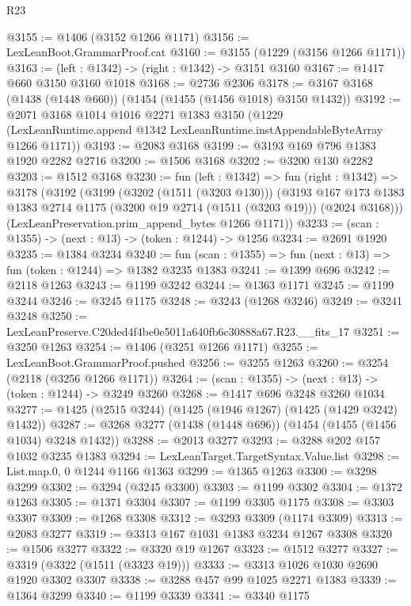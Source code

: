 \begin{lexlean}{R23}
\begin{coremodule}
@3155 := @1406 (@3152 @1266 @1171)
@3156 := LexLeanBoot.GrammarProof.cat
@3160 := @3155 (@1229 (@3156 @1266 @1171))
@3163 := (left : @1342) -> (right : @1342) -> @3151 @3160
@3167 := @1417 @660 @3150 @3160 @1018
@3168 := @2736 @2306
@3178 := @3167 @3168 (@1438 (@1448 @660)) (@1454 (@1455 (@1456 @1018) @3150 @1432))
@3192 := @2071
    @3168
    @1014
    @1016
    @2271
    @1383
    @3150
    (@1229 (LexLeanRuntime.append @1342 LexLeanRuntime.instAppendableByteArray @1266 @1171))
@3193 := @2083 @3168
@3199 := @3193 @169 @796 @1383 @1920 @2282 @2716
@3200 := @1506 @3168
@3202 := @3200 @130 @2282
@3203 := @1512 @3168
@3230 := fun (left : @1342) =>
  fun (right : @1342) =>
  @3178
    (@3192
      (@3199
        (@3202 (@1511 (@3203 @130)))
        (@3193
          @167
          @173
          @1383
          @1383
          @2714
          @1175
          (@3200 @19 @2714 (@1511 (@3203 @19)))
          (@2024 @3168)))
      (LexLeanPreservation.prim_append_bytes @1266 @1171))
@3233 := (scan : @1355) -> (next : @13) -> (token : @1244) -> @1256
@3234 := @2691 @1920
@3235 := @1384 @3234
@3240 := fun (scan : @1355) => fun (next : @13) => fun (token : @1244) => @1382 @3235 @1383
@3241 := @1399 @696
@3242 := @2118 @1263
@3243 := @1199 @3242
@3244 := @1363 @1171
@3245 := @1199 @3244
@3246 := @3245 @1175
@3248 := @3243 (@1268 @3246)
@3249 := @3241 @3248
@3250 := LexLeanPreserve.C20ded4f4be0e5011a640fb6c30888a67.R23.__fits_17
@3251 := @3250 @1263
@3254 := @1406 (@3251 @1266 @1171)
@3255 := LexLeanBoot.GrammarProof.pushed
@3256 := @3255 @1263
@3260 := @3254 (@2118 (@3256 @1266 @1171))
@3264 := (scan : @1355) -> (next : @13) -> (token : @1244) -> @3249 @3260
@3268 := @1417 @696 @3248 @3260 @1034
@3277 := @1425 (@2515 @3244) (@1425 (@1946 @1267) (@1425 (@1429 @3242) @1432))
@3287 := @3268 @3277 (@1438 (@1448 @696)) (@1454 (@1455 (@1456 @1034) @3248 @1432))
@3288 := @2013 @3277
@3293 := @3288 @202 @157 @1032 @3235 @1383
@3294 := LexLeanTarget.TargetSyntax.Value.list
@3298 := List.map.{0, 0} @1244 @1166 @1363
@3299 := @1365 @1263
@3300 := @3298 @3299
@3302 := @3294 (@3245 @3300)
@3303 := @1199 @3302
@3304 := @1372 @1263
@3305 := @1371 @3304
@3307 := @1199 @3305 @1175
@3308 := @3303 @3307
@3309 := @1268 @3308
@3312 := @3293 @3309 (@1174 @3309)
@3313 := @2083 @3277
@3319 := @3313 @167 @1031 @1383 @3234 @1267 @3308
@3320 := @1506 @3277
@3322 := @3320 @19 @1267
@3323 := @1512 @3277
@3327 := @3319 (@3322 (@1511 (@3323 @19)))
@3333 := @3313 @1026 @1030 @2690 @1920 @3302 @3307
@3338 := @3288 @457 @99 @1025 @2271 @1383
@3339 := @1364 @3299
@3340 := @1199 @3339
@3341 := @3340 @1175

\end{coremodule}
\end{lexlean}
